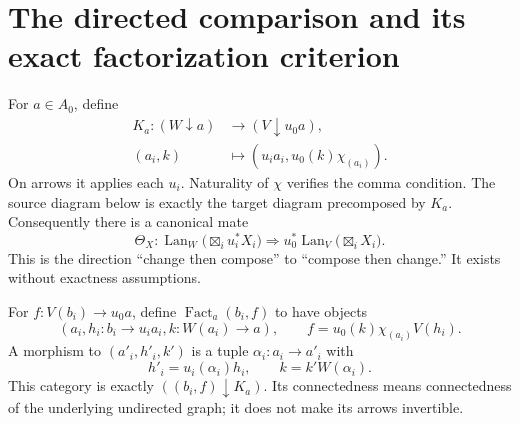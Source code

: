 \documentclass[11pt]{article}
\theoremstyle{definition}\newtheorem{definition}[theorem]{Definition}
\theoremstyle{remark}\newtheorem{remark}[theorem]{Remark}
\newcommand{\Lan}{\operatorname{Lan}}
\newcommand{\Fact}{\operatorname{Fact}}
\begin{document}
\section{The directed comparison and its exact factorization criterion}
For $a\in A_0$, define
\begin{align*}
 K_a:(W\downarrow a)&\longrightarrow(V\downarrow u_0a),\\
 (a_i,k)&\longmapsto
       (u_i a_i,u_0(k)\chi_{(a_i)}).
\end{align*}
On arrows it applies each $u_i$. Naturality of $\chi$ verifies the comma
condition. The source diagram below is exactly the target diagram
precomposed by $K_a$. Consequently there is a canonical mate
\begin{equation}\label{eq:mate}
 \Theta_X:\Lan_W\bigl(\mathop{\boxtimes}_i u_i^*X_i\bigr)
       \Longrightarrow u_0^*\Lan_V\bigl(\mathop{\boxtimes}_i X_i\bigr).
\end{equation}
This is the direction ``change then compose'' to ``compose then change.''
It exists without exactness assumptions.

For $f:V(b_i)\to u_0a$, define $\Fact_a(b_i,f)$ to have objects
\[
 (a_i,h_i:b_i\to u_i a_i,k:W(a_i)\to a),
 \qquad f=u_0(k)\chi_{(a_i)}V(h_i).
\]
A morphism to $(a'_i,h'_i,k')$ is a tuple $\alpha_i:a_i\to a'_i$ with
\[
 h'_i=u_i(\alpha_i)h_i,\qquad k=k'W(\alpha_i).
\]
This category is exactly $((b_i,f)\downarrow K_a)$. Its connectedness
means connectedness of the underlying undirected graph; it does not make
its arrows invertible.
\end{document}
